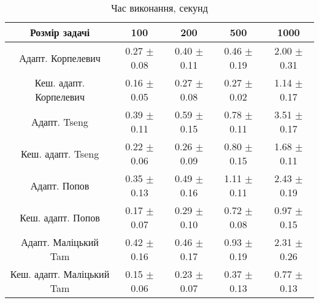 \begin{table}[H]
	\centering
	\begin{tabular}{|c||c|c|c|c|}\hline
		Розмір задачі & 100 & 200 & 500 & 1000 \\ \hline \hline
		Адапт. Корпелевич & 0.27 $\pm$ 0.08 & 0.40 $\pm$ 0.11 & 0.46 $\pm$ 0.19 & 2.00 $\pm$ 0.31 \\ \hline
		Кеш. адапт. Корпелевич & 0.16 $\pm$ 0.05 & 0.27 $\pm$ 0.08 & 0.27 $\pm$ 0.02 & 1.14 $\pm$ 0.17 \\ \hline
		Адапт. Tseng & 0.39 $\pm$ 0.11 & 0.59 $\pm$ 0.15 & 0.78 $\pm$ 0.11 & 3.51 $\pm$ 0.17 \\ \hline
		Кеш. адапт. Tseng & 0.22 $\pm$ 0.06 & 0.26 $\pm$ 0.09 & 0.80 $\pm$ 0.15 & 1.68 $\pm$ 0.11 \\ \hline
		Адапт. Попов & 0.35 $\pm$ 0.13 & 0.49 $\pm$ 0.16 & 1.11 $\pm$ 0.11 & 2.43 $\pm$ 0.19 \\ \hline
		Кеш. адапт. Попов & 0.17 $\pm$ 0.07 & 0.29 $\pm$ 0.10 & 0.72 $\pm$ 0.08 & 0.97 $\pm$ 0.15 \\ \hline
		Адапт. Маліцький Tam & 0.42 $\pm$ 0.16 & 0.46 $\pm$ 0.17 & 0.93 $\pm$ 0.19 & 2.31 $\pm$ 0.26 \\ \hline
		Кеш. адапт. Маліцький Tam & 0.15 $\pm$ 0.06 & 0.23 $\pm$ 0.07 & 0.37 $\pm$ 0.13 & 0.77 $\pm$ 0.13 \\ \hline
	\end{tabular}
	\caption{Час виконання, секунд}
\end{table}
